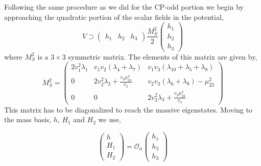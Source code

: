 Following the same procedure as we did for the CP-odd portion we begin by approaching the quadratic portion of the scalar fields in the potential,
%
\begin{equation}
V \supset \left( \begin{array}{ccc} 
h_1 & h_2 & h_3 
\end{array} \right) 
\frac{M_S^2}{2} \left( \begin{array}{c}
h_1 \\ 
h_2 \\
h_3
\end{array} \right) 
\end{equation}
where $M_S^2$ is a $3\times3$ symmetric matrix. The elements of this matrix are given by,
\begin{equation}
M_S^2 = \begin{pmatrix}
2 v_1^2 \lambda_1 & v_1 v_2 \left( \lambda_4 + \lambda_7 \right) & v_1 v_3 \left( \lambda_{10} + \lambda_5 + \lambda_8 \right) \\ 
0 & 2 v_2^2 \lambda_2 + \frac{v_3 \mu_{23}^2}{v_2} & v_2 v_3 \left( \lambda_6 + \lambda_9 \right) - \mu_{23}^2 \\ 
0 & 0 & 2 v_3^2 \lambda_3 + \frac{v_2 \mu_{23}^2}{v_3}  
\end{pmatrix}
\end{equation}
%
This matrix has to be diagonalized to reach the massive eigenstates. Moving to the mass basis, $h$, $H_1$ and $H_2$ we use,
\begin{comment}
\begin{equation}
\begin{split}
\left(M_S^2\right)_{11} & \\
\left(M_S^2\right)_{12} & \\
\left(M_S^2\right)_{13} & \\
\left(M_S^2\right)_{22} & \\
\left(M_S^2\right)_{23} & \\
\left(M_S^2\right)_{33} & 
\end{split}
\end{equation}
\end{comment} 
\begin{equation}
\left( 
\begin{array}{c}
h   \\
H_1 \\
H_2 
\end{array} 
\right) = \mathcal{O}_\alpha \left( 
\begin{array}{c}
h_1 \\
h_2 \\
h_3 
\end{array} 
\right)
\end{equation} 

